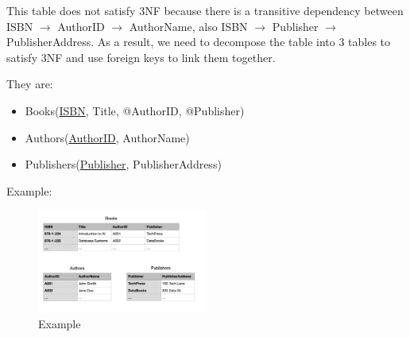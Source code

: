 \documentclass{article}
\begin{document}
\begin{CJK*}{UTF8}{gbsn}
    This table does not satisfy 3NF because there is a transitive dependency between ISBN $\rightarrow$ AuthorID $\rightarrow$ AuthorName,
    also ISBN $\rightarrow$ Publisher $\rightarrow$ PublisherAddress. As
    a result, we need to decompose the table into 3 tables to satisfy 3NF and use 
    foreign keys to link them together.

    They are:
    \begin{itemize}
        \item Books(\underline{ISBN}, Title, @AuthorID, @Publisher)
        \item Authors(\underline{AuthorID}, AuthorName)
        \item Publishers(\underline{Publisher}, PublisherAddress)
    \end{itemize}
    Example:
    \begin{figure}[H]
        \centering
        \includegraphics[width=0.5\textwidth]{Example.png}
        \caption{Example}
    \end{figure}



\end{CJK*}
\end{document}
